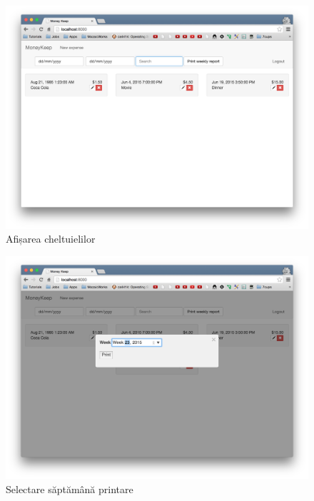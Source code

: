 \begin{figure}
  \includegraphics[width=1\textwidth]{./chap5-files/main_page}
  \caption{Afișarea cheltuielilor}
  \label{fig:list-expenses}
\end{figure}

\begin{figure}
  \includegraphics[width=1\textwidth]{./chap5-files/print_weekly1}
  \caption{Selectare săptămână printare}
  \label{fig:list-expenses}
\end{figure}

